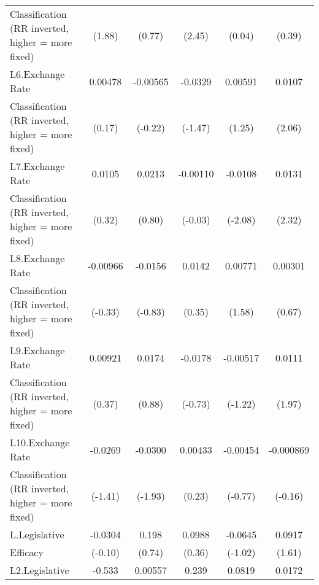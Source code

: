 {\begin{tabular}{l*{5}{c}}
Classification (RR inverted, higher = more fixed)&      (1.88)         &      (0.77)         &      (2.45)         &      (0.04)         &      (0.39)         \\
[1em]
L6.Exchange Rate    &     0.00478         &    -0.00565         &     -0.0329         &     0.00591         &      0.0107\sym{*}  \\
Classification (RR inverted, higher = more fixed)&      (0.17)         &     (-0.22)         &     (-1.47)         &      (1.25)         &      (2.06)         \\
[1em]
L7.Exchange Rate    &      0.0105         &      0.0213         &    -0.00110         &     -0.0108\sym{*}  &      0.0131\sym{*}  \\
Classification (RR inverted, higher = more fixed)&      (0.32)         &      (0.80)         &     (-0.03)         &     (-2.08)         &      (2.32)         \\
[1em]
L8.Exchange Rate    &    -0.00966         &     -0.0156         &      0.0142         &     0.00771         &     0.00301         \\
Classification (RR inverted, higher = more fixed)&     (-0.33)         &     (-0.83)         &      (0.35)         &      (1.58)         &      (0.67)         \\
[1em]
L9.Exchange Rate    &     0.00921         &      0.0174         &     -0.0178         &    -0.00517         &      0.0111         \\
Classification (RR inverted, higher = more fixed)&      (0.37)         &      (0.88)         &     (-0.73)         &     (-1.22)         &      (1.97)         \\
[1em]
L10.Exchange Rate   &     -0.0269         &     -0.0300         &     0.00433         &    -0.00454         &   -0.000869         \\
Classification (RR inverted, higher = more fixed)&     (-1.41)         &     (-1.93)         &      (0.23)         &     (-0.77)         &     (-0.16)         \\
[1em]
L.Legislative       &     -0.0304         &       0.198         &      0.0988         &     -0.0645         &      0.0917         \\
Efficacy            &     (-0.10)         &      (0.74)         &      (0.36)         &     (-1.02)         &      (1.61)         \\
[1em]
L2.Legislative      &      -0.533         &     0.00557         &       0.239         &      0.0819         &      0.0172         \\

\end{tabular}}
